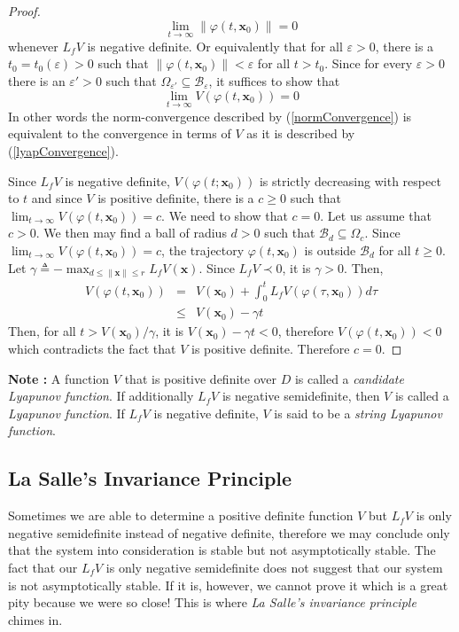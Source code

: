 \documentclass[a4paper,10pt,oneside]{book}
\begin{document}
\begin{proof}
\begin{equation}
 \lim_{t\to\infty}\|\varphi(t,\mathbf{x}_0)\|=0\label{normConvergence}
\end{equation}
whenever $L_f V$ is negative definite.
Or equivalently that for all $\varepsilon>0$, there is a $t_0=t_0(\varepsilon)>0$ 
such that $\|\varphi(t,\mathbf{x}_0)\|<\varepsilon$ for all $t>t_0$. Since for every
$\varepsilon>0$ there is an $\varepsilon'>0$ such that $\Omega_{\varepsilon'}\subseteq \mathcal B_\varepsilon$,
it suffices to show that 
\begin{equation}
 \lim_{t\to\infty}V\left(\varphi(t,\mathbf{x}_0)\right)=0\label{lyapConvergence}
\end{equation}
In other words the norm-convergence described by (\ref{normConvergence}) is equivalent to the
convergence in terms of $V$ as it is described by (\ref{lyapConvergence}).

Since $L_f V$ is negative definite, $V(\varphi(t;\mathbf{x}_0))$ is strictly decreasing with
respect to $t$ and since $V$ is positive definite, there is a $c\geq 0$ such that
$\lim_{t\to\infty}V\left(\varphi(t,\mathbf{x}_0)\right)=c$. We need to show that $c=0$.
Let us assume that $c>0$. We then may find a ball of radius $d>0$ such that $\mathcal B_d\subseteq \Omega_c$.
Since $\lim_{t\to\infty}V\left(\varphi(t,\mathbf{x}_0)\right)=c$, the trajectory $\varphi(t,\mathbf{x}_0)$
is outside $\mathcal B_d$ for all $t\geq 0$. Let $\gamma\triangleq -\max_{d\leq \|\mathbf{x}\| \leq r}
L_f V(\mathbf{x})$. Since $L_f V\prec 0$, it is $\gamma>0$. Then,
\begin{eqnarray}
 V\left(\varphi(t,\mathbf{x}_0)\right) &=& 
V\left(\mathbf{x}_0\right)+
\int_0^t L_f V(\varphi(\tau,\mathbf{x}_0))d\tau\\
&\leq& V\left(\mathbf{x}_0\right)-\gamma t
\end{eqnarray}
Then, for all $t>V\left(\mathbf{x}_0\right)/\gamma$, it is $V\left(\mathbf{x}_0\right)-\gamma t<0$, 
therefore $V\left(\varphi(t,\mathbf{x}_0)\right)<0$ which contradicts the fact that $V$ is positive
definite. Therefore $c=0$.
\end{proof}

\noindent \textbf{Note :} A function $V$ that is positive definite over $D$ is called a 
\emph{candidate Lyapunov function}. If additionally $L_fV$ is negative semidefinite, then
$V$ is called a \emph{Lyapunov function}. If $L_fV$ is negative definite, $V$ is said to 
be a \emph{string Lyapunov function}.


\subsection{La Salle's Invariance Principle}
Sometimes we are able to determine a positive definite function $V$ but $L_f V$
is only negative semidefinite instead of negative definite, therefore we may conclude only
that the system into consideration is stable but not asymptotically stable. The fact that
our $L_f V$ is only negative semidefinite does not suggest that our system is not 
asymptotically stable. If it is, however, we cannot prove it which is a great pity 
because we were so close! This is where \emph{La Salle's invariance principle} chimes in.
\end{document}
